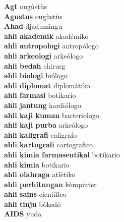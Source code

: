 \textbf{ Agt  } ougùstùs \\
\textbf{ Agustus  } ougùstùs \\
\textbf{ Ahad  } djadumingu \\
\textbf{ ahli akademik  } akadémiko \\
\textbf{ ahli antropologi  } antropólogo \\
\textbf{ ahli arkeologi  } arkeólogo \\
\textbf{ ahli bedah  } chirurg \\
\textbf{ ahli biologi  } biólogo \\
\textbf{ ahli diplomat  } diplomátiko \\
\textbf{ ahli farmasi  } botikario \\
\textbf{ ahli jantung  } kardiólogo \\
\textbf{ ahli kaji kuman  } bacteriologo \\
\textbf{ ahli kaji purba  } arkeólogo \\
\textbf{ ahli kaligrafi  } caligrafo \\
\textbf{ ahli kartografi  } cartografico \\
\textbf{ ahli kimia farmaseutikal  } botikario \\
\textbf{ ahli kimia  } botikario \\
\textbf{ ahli olahraga  } atlétiko \\
\textbf{ ahli perhitungan  } kòmpiuter \\
\textbf{ ahli sains  } cientifico \\
\textbf{ ahli tinju  } bòksdó \\
\textbf{ AIDS  } yuda \\
